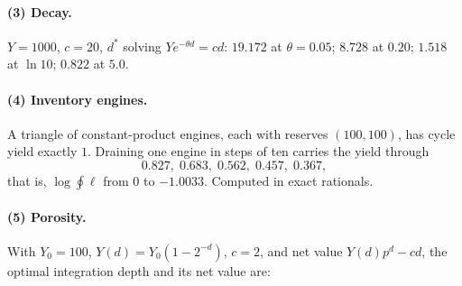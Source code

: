 \paragraph{(3) Decay.} $Y = 1000$, $c = 20$, $d^\ast$ solving
$Ye^{-\theta d} = cd$: $19.172$ at $\theta = 0.05$; $8.728$ at $0.20$;
$1.518$ at $\ln 10$; $0.822$ at $5.0$.

\paragraph{(4) Inventory engines.} A triangle of constant-product engines,
each with reserves $(100,100)$, has cycle yield exactly $1$. Draining one
engine in steps of ten carries the yield through
\[
  0.827,\; 0.683,\; 0.562,\; 0.457,\; 0.367,
\]
that is, $\log \oint \ell$ from $0$ to $-1.0033$. Computed in exact
rationals.

\paragraph{(5) Porosity.} With $Y_0 = 100$, $Y(d) = Y_0(1-2^{-d})$,
$c = 2$, and net value $Y(d)p^d - cd$, the optimal integration depth and
its net value are:

\begin{center}\small
{}
\end{center}


